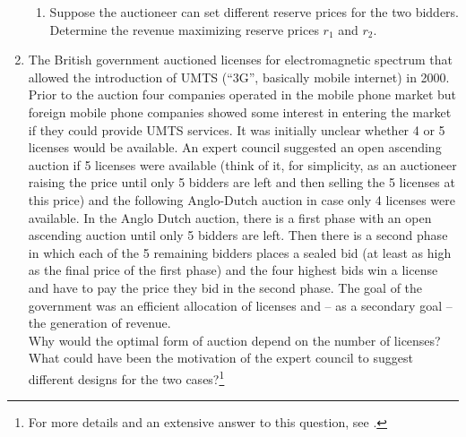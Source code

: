 \documentclass[a4paper,12pt]{article}
\begin{document}
\begin{enumerate}
\begin{enumerate}
  \item Suppose the auctioneer can set different reserve prices for the two bidders. Determine the revenue maximizing reserve prices $r_1$ and $r_2$.
  \end{enumerate}
  \item The British government auctioned licenses for electromagnetic spectrum that allowed the introduction of UMTS (``3G'', basically mobile internet) in 2000. Prior to the auction four companies operated in the mobile phone market but foreign mobile phone companies showed some interest in entering the market if they could provide UMTS services. It was initially unclear whether 4 or 5 licenses would be available. An expert council suggested an open ascending auction if 5 licenses were available (think of it, for simplicity, as an auctioneer raising the price until only 5 bidders are left and then selling the 5 licenses at this price) and the following Anglo-Dutch auction in case only 4 licenses were available. In the Anglo Dutch auction, there is a first phase with an open ascending auction until only 5 bidders are left. Then there is a second phase in which each of the 5 remaining bidders places a sealed bid (at least as high as the final price of the first phase) and the four highest bids win a license and have to pay the price they bid in the second phase. The goal of the government was an efficient allocation of licenses and -- as a secondary goal -- the generation of revenue.\\
    Why would the optimal form of auction depend on the number of licenses? What could have been the motivation of the expert council to suggest different designs for the two cases?\footnote{For more details and an extensive answer to this question, see  \citet[ch. 6]{klemperer2004auctions}.}

\end{enumerate}
\end{document}
